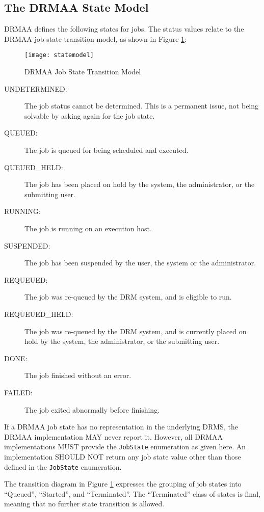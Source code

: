 \documentclass{article}
\newcommand{\h}[1]{\lstinline|#1|}
\begin{document}
\subsection{The DRMAA State Model}
\label{sec:jobstates}

DRMAA defines the following states for jobs. The status values relate to the DRMAA job state transition model, as shown in Figure \ref{fig:statemodel}:

\begin{figure}[ht]
\centering
\texttt{[image: statemodel]}
\caption{DRMAA Job State Transition Model}
\label{fig:statemodel}
\end{figure}



\begin{description}
\item[UNDETERMINED:] The job status cannot be determined. This is a permanent issue, not being solvable by asking again for the job state.
\item[QUEUED:] The job is queued for being scheduled and executed.
\item[QUEUED\_HELD:] The job has been placed on hold by the system, the administrator, or the submitting user.
\item[RUNNING:] The job is running on an execution host.
\item[SUSPENDED:] The job has been suspended by the user, the system or the administrator.
\item[REQUEUED:] The job was re-queued by the DRM system, and is eligible to run.
\item[REQUEUED\_HELD:] The job was re-queued by the DRM system, and is currently placed on hold by the system, the administrator, or the submitting user.
\item[DONE:] The job finished without an error.
\item[FAILED:] The job exited abnormally before finishing.
\end{description}

If a DRMAA job state has no representation in the underlying DRMS, the DRMAA implementation MAY never report it. However, all DRMAA implementations MUST provide the \h{JobState} enumeration as given here. An implementation SHOULD NOT return any job state value other than those defined in the \h{JobState} enumeration.

The transition diagram in Figure \ref{fig:statemodel} expresses the grouping of job states into \enquote{Queued}, \enquote{Started}, and \enquote{Terminated}. The \enquote{Terminated} class of states is final, meaning that no further state transition is  allowed. 
\end{document}
